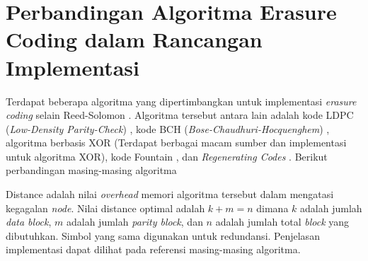 \chapter{Perbandingan Algoritma Erasure Coding dalam Rancangan Implementasi}
\label{appendix:ec-algorithms}

Terdapat beberapa algoritma yang dipertimbangkan untuk implementasi \textit{erasure coding} selain Reed-Solomon \parencite{manasse2009reed}. Algoritma tersebut antara lain adalah kode LDPC (\textit{Low-Density Parity-Check}) \parencite{gallagher1962ldpc}, kode BCH (\textit{Bose-Chaudhuri-Hocquenghem}) \parencite{bose1960bch}, algoritma berbasis XOR (Terdapat berbagai macam sumber dan implementasi untuk algoritma XOR), kode Fountain \parencite{asteris2014fountain}, dan \textit{Regenerating Codes} \parencite{rashmi2012regenerating}. Berikut perbandingan masing-masing algoritma 

\begin{table}[ht]
    \centering
    \caption{Perbandingan algoritma erasure coding}
    \label{tab:ec-algorithm}
\end{table}

Distance adalah nilai \textit{overhead} memori algoritma tersebut dalam mengatasi kegagalan \textit{node}. Nilai distance optimal adalah $k + m = n$ dimana $k$ adalah jumlah \textit{data block}, $m$ adalah jumlah \textit{parity block}, dan $n$ adalah jumlah total \textit{block} yang dibutuhkan. Simbol yang sama digunakan untuk redundansi. Penjelasan implementasi dapat dilihat pada referensi masing-masing algoritma.